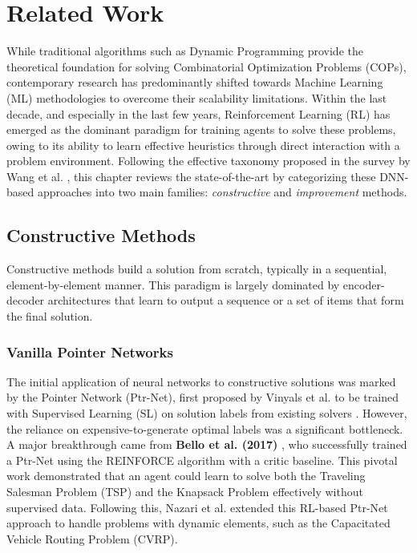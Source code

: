 \chapter{Related Work}
\label{chap:related_work}

While traditional algorithms such as Dynamic Programming provide the theoretical foundation for solving Combinatorial Optimization Problems (COPs), contemporary research has predominantly shifted towards Machine Learning (ML) methodologies to overcome their scalability limitations. Within the last decade, and especially in the last few years, Reinforcement Learning (RL) has emerged as the dominant paradigm for training agents to solve these problems, owing to its ability to learn effective heuristics through direct interaction with a problem environment. Following the effective taxonomy proposed in the survey by Wang et al. \cite{wangSolvingCombinatorialOptimization2024}, this chapter reviews the state-of-the-art by categorizing these DNN-based approaches into two main families: \textit{constructive} and \textit{improvement} methods.

\section{Constructive Methods}
Constructive methods build a solution from scratch, typically in a sequential, element-by-element manner. This paradigm is largely dominated by encoder-decoder architectures that learn to output a sequence or a set of items that form the final solution.

\subsection{Vanilla Pointer Networks}
The initial application of neural networks to constructive solutions was marked by the Pointer Network (Ptr-Net), first proposed by Vinyals et al. to be trained with Supervised Learning (SL) on solution labels from existing solvers \cite{wangSolvingCombinatorialOptimization2024}. However, the reliance on expensive-to-generate optimal labels was a significant bottleneck. A major breakthrough came from \textbf{Bello et al. (2017)} \cite{belloNeuralCombinatorialOptimization2017}, who successfully trained a Ptr-Net using the REINFORCE algorithm with a critic baseline. This pivotal work demonstrated that an agent could learn to solve both the Traveling Salesman Problem (TSP) and the Knapsack Problem effectively without supervised data. Following this, Nazari et al. extended this RL-based Ptr-Net approach to handle problems with dynamic elements, such as the Capacitated Vehicle Routing Problem (CVRP).

